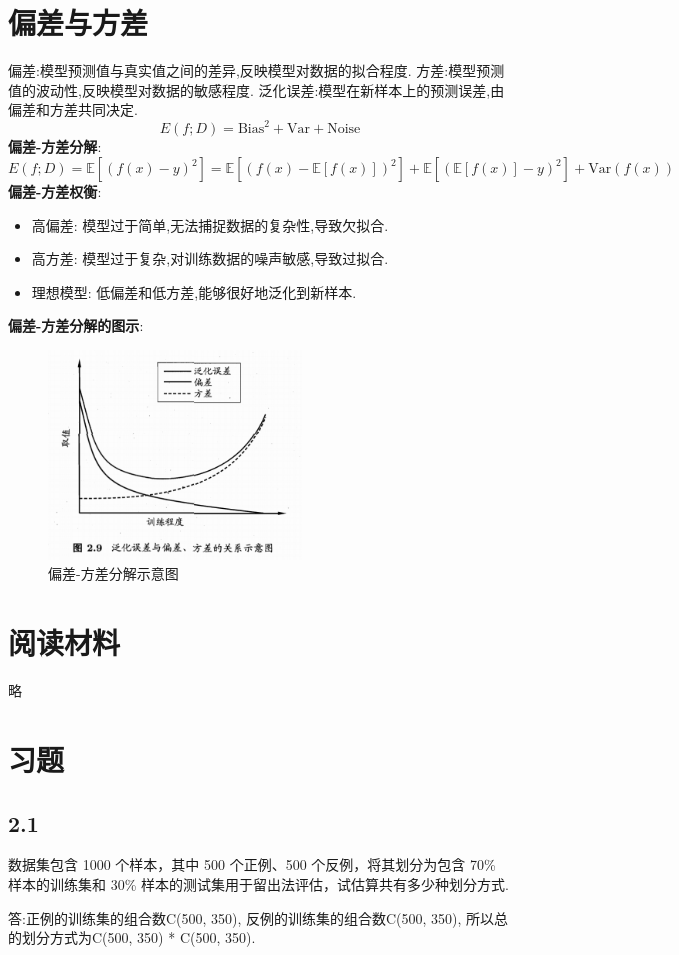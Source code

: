 \section{偏差与方差}
偏差:模型预测值与真实值之间的差异,反映模型对数据的拟合程度.
方差:模型预测值的波动性,反映模型对数据的敏感程度.
泛化误差:模型在新样本上的预测误差,由偏差和方差共同决定.
\begin{equation}
    E(f;D) = \text{Bias}^2 + \text{Var} + \text{Noise}
\end{equation}
\textbf{偏差-方差分解}:
\begin{equation}
    E(f;D) = \mathbb{E}[(f(x) - y)^2] = \mathbb{E}[(f(x) - \mathbb{E}[f(x)])^2] + \mathbb{E}[(\mathbb{E}[f(x)] - y)^2] + \text{Var}(f(x))
\end{equation}
\textbf{偏差-方差权衡}:
\begin{itemize}
    \item 高偏差: 模型过于简单,无法捕捉数据的复杂性,导致欠拟合.
    \item 高方差: 模型过于复杂,对训练数据的噪声敏感,导致过拟合.
    \item 理想模型: 低偏差和低方差,能够很好地泛化到新样本.
\end{itemize}
\textbf{偏差-方差分解的图示}:
\begin{figure}[H]
    \centering
    \includegraphics[width=0.6\textwidth]{static/images/偏差方差误差图.png}
    \caption{偏差-方差分解示意图}
    \label{fig:bias_variance_decomposition}
\end{figure}
\section{阅读材料}
略
\section{习题}
\subsection*{2.1}
数据集包含 1000 个样本，其中 500 个正例、500 个反例，将其划分为包含 70\% 样本的训练集和 30\% 样本的测试集用于留出法评估，试估算共有多少种划分方式.
\par 答:正例的训练集的组合数C(500, 350), 反例的训练集的组合数C(500, 350), 所以总的划分方式为C(500, 350) * C(500, 350).
